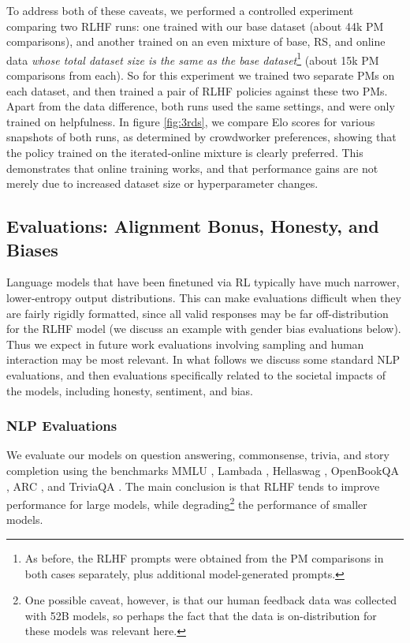 To address both of these caveats, we performed a controlled experiment comparing two RLHF runs: one trained with our base dataset (about 44k PM comparisons), and another trained on an even mixture of base, RS, and online data {\it whose total dataset size is the same as the base dataset}\footnote{As before, the RLHF prompts were obtained from the PM comparisons in both cases separately, plus additional model-generated prompts.} (about 15k PM comparisons from each).  So for this experiment we trained two separate PMs on each dataset, and then trained a pair of RLHF policies against these two PMs.  Apart from the data difference, both runs used the same settings, and were only trained on helpfulness. In figure \ref{fig:3rds},  we compare Elo scores for various snapshots of both runs, as determined by crowdworker preferences, showing that the policy trained on the iterated-online mixture is clearly preferred.  This demonstrates that online training  works, and that performance gains are not merely due to increased dataset size or hyperparameter changes.

\subsection{Evaluations: Alignment Bonus, Honesty, and Biases}

Language models that have been finetuned via RL typically have much narrower, lower-entropy output distributions.  This can make evaluations difficult when they are fairly rigidly formatted, since all valid responses may be far off-distribution for the RLHF model (we discuss an example with gender bias evaluations below).  Thus we expect in future work evaluations involving sampling and human interaction may be most relevant.  In what follows we discuss some standard NLP evaluations, and then evaluations specifically related to the societal impacts of the models, including honesty, sentiment, and bias.

\subsubsection{NLP Evaluations}

We evaluate our models on question answering, commonsense, trivia, and story completion using the benchmarks MMLU \cite{hendrycks2021measuring}, Lambada \cite{paperno2016lambada}, Hellaswag \cite{zellers2019hellaswag}, OpenBookQA \cite{Mihaylov2018CanAS}, ARC \cite{Clark2018ThinkYH}, and TriviaQA \cite{joshi2017triviaqa}.  The main conclusion is that RLHF tends to improve performance for large models, while degrading\footnote{One possible caveat, however, is that our human feedback data was collected with 52B models, so perhaps the fact that the data is on-distribution for these models was relevant here.} the performance of smaller models.  

